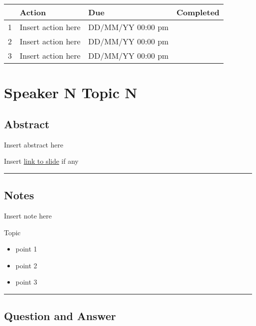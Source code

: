 \documentclass[
]{book}
\providecommand{\tightlist}{%
  \setlength{\itemsep}{0pt}\setlength{\parskip}{0pt}}
\begin{document}
\begin{longtable}[]{@{}llll@{}}
\toprule
& Action & Due & Completed\tabularnewline
\midrule
\endhead
1 & Insert action here & DD/MM/YY 00:00 pm &\tabularnewline
2 & Insert action here & DD/MM/YY 00:00 pm &\tabularnewline
3 & Insert action here & DD/MM/YY 00:00 pm &\tabularnewline
\bottomrule
\end{longtable}

\hypertarget{speaker-n-topic-n-1}{%
\chapter{Speaker N Topic N}\label{speaker-n-topic-n-1}}

\hypertarget{abstract-30}{%
\section*{Abstract}\label{abstract-30}}

Insert abstract here

Insert \href{}{link to slide} if any

\begin{center}\rule{0.5\linewidth}{0.5pt}\end{center}

\hypertarget{notes-30}{%
\section*{Notes}\label{notes-30}}

Insert note here

Topic

\begin{itemize}
\tightlist
\item
  point 1
\item
  point 2
\item
  point 3
\end{itemize}

\begin{center}\rule{0.5\linewidth}{0.5pt}\end{center}

\hypertarget{question-and-answer-30}{%
\section*{Question and Answer}\label{question-and-answer-30}}
\end{document}
